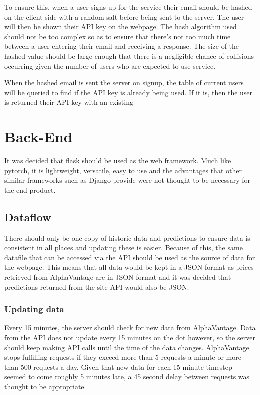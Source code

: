         To ensure this, when a user signs up for the service their email should be hashed on the client side with a random salt before being sent to the server. The user will then be shown their API key on the webpage. The hash algorithm used should not be too complex so as to ensure that there's not too much time between a user entering their email and receiving a response. The size of the hashed value should be large enough that there is a negligible chance of collisions occurring given the number of users who are expected to use service.

        When the hashed email is sent the server on signup, the table of current users will be queried to find if the API key is already being used. If it is, then the user is returned their API key with an existing  
    

        
    \section{Back-End}

        It was decided that flask should be used as the web framework. Much like pytorch, it is lightweight, versatile, easy to use and the advantages that other similar frameworks such as Django provide were not thought to be necessary for the end product.

        \subsection{Dataflow}
        There should only be one copy of historic data and predictions to ensure data is consistent in all places and updating these is easier. Because of this, the same datafile that can be accessed via the API should be used as the source of data for the webpage. This means that all data would be kept in a JSON format as prices retrieved from AlphaVantage are in JSON format and it was decided that predictions returned from the site API would also be JSON.
            
            \subsubsection{Updating data}
            Every 15 minutes, the server should check for new data from AlphaVantage. Data from the API does not update every 15 minutes on the dot however, so the server should keep making API calls until the time of the data changes. AlphaVantage stops fulfilling requests if they exceed more than 5 requests a minute or more than 500 requests a day. Given that new data for each 15 minute timestep seemed to come roughly 5 minutes late, a 45 second delay between requests was thought to be appropriate.

